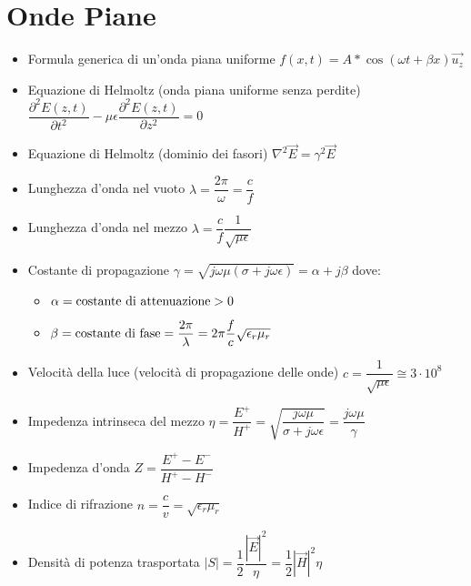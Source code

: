 \documentclass{article}
\begin{document}
\section{Onde Piane}
\begin{itemize}
	\item Formula generica di un'onda piana uniforme \( f(x, t) = A * \cos\left(\omega t + \beta x \right) \vec{u_z} \)
	\item Equazione di Helmoltz (onda piana uniforme senza perdite) \( \dfrac{\partial^2 E(z, t)}{\partial t^2} - \mu \epsilon \dfrac{\partial^2 E(z, t)}{\partial z^2} = 0\)
	\item Equazione di Helmoltz (dominio dei fasori) \( \nabla^2 \vec{E} = \gamma^2 \vec{E} \)
	\item Lunghezza d'onda nel vuoto \( \lambda = \dfrac{2 \pi}{\omega} = \dfrac{c}{f} \)
	\item Lunghezza d'onda nel mezzo \( \lambda = \dfrac{c}{f} \dfrac{1}{\sqrt{\mu \epsilon}} \)
	\item Costante di propagazione \( \gamma = \sqrt{j\omega\mu (\sigma + j \omega \epsilon) } = \alpha + j \beta \) dove:
	      \begin{itemize}
		      \item \( \alpha = \textnormal{costante di attenuazione} > 0\)
		      \item \( \beta = \textnormal{costante di fase} = \dfrac{2 \pi}{\lambda} = 2 \pi \dfrac{f}{c} \sqrt{\epsilon_r \mu_r}\)
	      \end{itemize}
	\item Velocità della luce (velocità di propagazione delle onde) \( c = \dfrac{1}{\sqrt{\mu \epsilon}} \cong 3 \cdot 10^8 \)
	\item Impedenza intrinseca del mezzo \( \eta = \dfrac{E^+}{H^+} = \displaystyle \sqrt{\dfrac{j \omega \mu}{\sigma + j \omega \epsilon}} = \dfrac{j \omega \mu}{\gamma}\)
	\item Impedenza d'onda \( Z = \dfrac{E^+ - E^-}{H^+ - H^-} \)
	\item Indice di rifrazione \( n = \dfrac{c}{v} = \sqrt{\epsilon_r \mu_r} \)
	\item Densità di potenza trasportata \( |S| = \dfrac{1}{2} \dfrac{|\vec{E}|^2}{\eta} = \dfrac{1}{2} |\vec{H}|^2 \eta \)
\end{itemize}
\end{document}
